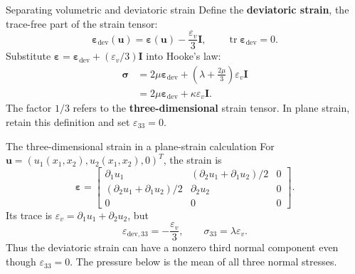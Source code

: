 \documentclass[11pt,aspectratio=169]{beamer}
\newcommand{\bu}{\bm u}
\newcommand{\bI}{\bm I}
\newcommand{\beps}{\bm\varepsilon}
\newcommand{\bsig}{\bm\sigma}
\DeclareMathOperator{\tr}{tr}
\begin{document}
\begin{frame}{Separating volumetric and deviatoric strain}
Define the \textbf{deviatoric strain}, the trace-free part of the strain tensor:
\[
\beps_{\mathrm{dev}}(\bu)
=\beps(\bu)-\frac{\varepsilon_v}{3}\bI,
\qquad \tr\beps_{\mathrm{dev}}=0.
\]
Substitute $\beps=\beps_{\mathrm{dev}}+(\varepsilon_v/3)\bI$ into Hooke's law:
\[
\begin{aligned}
\bsig
&=2\mu\beps_{\mathrm{dev}}+
   \left(\lambda+\frac{2\mu}{3}\right)\varepsilon_v\bI\\
&=2\mu\beps_{\mathrm{dev}}+\kappa\varepsilon_v\bI.
\end{aligned}
\]
The factor $1/3$ refers to the \textbf{three-dimensional} strain tensor.
In plane strain, retain this definition and set $\varepsilon_{33}=0$.
\end{frame}

\begin{frame}{The three-dimensional strain in a plane-strain calculation}
For $\bu=(u_1(x_1,x_2),u_2(x_1,x_2),0)^T$, the strain is
\[
\beps=
\begin{bmatrix}
\partial_1u_1 & (\partial_2u_1+\partial_1u_2)/2 & 0\\
(\partial_2u_1+\partial_1u_2)/2 & \partial_2u_2 & 0\\
0&0&0
\end{bmatrix}.
\]
Its trace is $\varepsilon_v=\partial_1u_1+\partial_2u_2$, but
\[
\varepsilon_{\mathrm{dev},33}=-\frac{\varepsilon_v}{3},
\qquad \sigma_{33}=\lambda\varepsilon_v.
\]
Thus the deviatoric strain can have a nonzero third normal component even
though $\varepsilon_{33}=0$. The pressure below is the mean of all three
normal stresses.
\end{frame}
\end{document}
